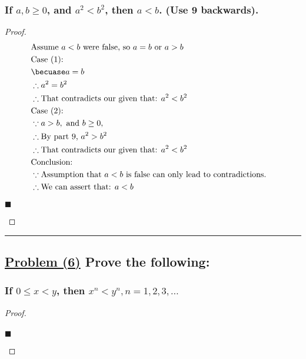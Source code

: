 \documentclass[letterpaper, 10 pt, conference]{ieeeconf}  %
\begin{document}
\subsubsection{\textbf{If $a, b \geqslant  0$, and $a^2 < b^2$, then $a < b$. (Use 9 backwards).}}

\begin{proof}
\begin{align}
    &\text{Assume } a < b \text{ were false, so } a = b \text{ or } a > b && \\
    &\text{Case (1): } && \\
    &\becuase a = b && \\
    &\therefore a^2 = b^2 && \\
    &\therefore \text{That contradicts our given that: } a^2 < b^2 && \\
    &\text{Case (2): } && \\
    &\because a > b, \text{ and } b \geq 0, &&\\
    &\therefore \text{By part 9, } a^2 > b^2 &&\\
    &\therefore \text{That contradicts our given that: } a^2 < b^2 &&\\ 
    &\text{Conclusion: }&&\\
    &\because \text{Assumption that } a < b \text{ is false can only lead to contradictions.} &&\\
    &\therefore \text{We can assert that: } a < b &&
\end{align}
\begin{flushright}
$\blacksquare$
\end{flushright}
\end{proof}

\noindent\rule{8cm}{0.4pt}
\begin{figure}[thpb]
      \centering
\end{figure}
\subsection{\textbf{\underline{Problem (6)} Prove the following:}}

\subsubsection{\textbf{If $0 \leq x < y$, then $x^n < y^n, n = 1, 2, 3, \ldots $}}
\begin{proof}
\begin{align}
    
\end{align}
\begin{flushright}
$\blacksquare$
\end{flushright}
\end{proof}
\end{document}
